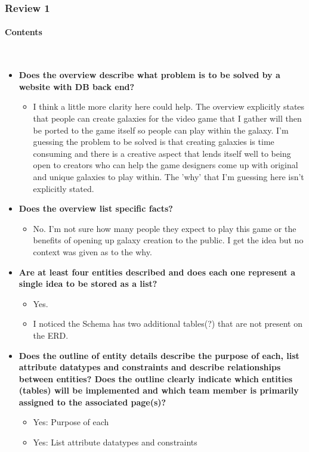 \documentclass[12pt]{article}
\newcommand{\hiparagraph}[1]{\paragraph{#1}\mbox{}\vspace{-2em}\\}
\begin{document}
\begin{appendices}
\subsubsection{Review 1}
\hiparagraph{Contents}
\begin{itemize}
    \item \textbf{Does the overview describe what problem is to be solved by a website with DB back end?}
    \begin{itemize}
        \item I think a little more clarity here could help. The overview explicitly states that people can create galaxies for the video game that I gather will then be ported to the game itself so people can play within the galaxy. I'm guessing the problem to be solved is that creating galaxies is time consuming and there is a creative aspect that lends itself well to being open to creators who can help the game designers come up with original and unique galaxies to play within. The 'why' that I'm guessing here isn't explicitly stated.
    \end{itemize}
    \item \textbf{Does the overview list specific facts?}
    \begin{itemize}
        \item No. I'm not sure how many people they expect to play this game or the benefits of opening up galaxy creation to the public. I get the idea but no context was given as to the why.
    \end{itemize}
    \item \textbf{Are at least four entities described and does each one represent a single idea to be stored as a list?}
    \begin{itemize}
        \item Yes.
        \item I noticed the Schema has two additional tables(?) that are not present on the ERD.
    \end{itemize}
    \item \textbf{Does the outline of entity details describe the purpose of each, list attribute datatypes and constraints and describe relationships between entities?  Does the outline clearly indicate which entities (tables) will be implemented and which team member is primarily assigned to the associated page(s)?}
    \begin{itemize}
        \item Yes: Purpose of each
        \item Yes: List attribute datatypes and constraints

\end{itemize}
\end{itemize}
\end{appendices}
\end{document}
